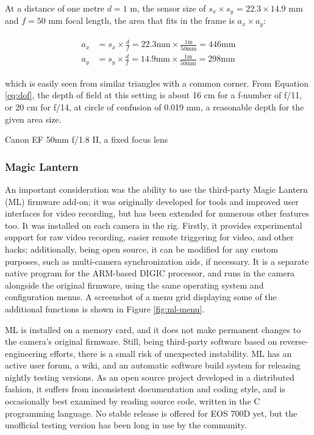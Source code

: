 At a distance of one metre $d = 1$ m, the sensor size of $s_x \times s_y$ = $22.3 \times 14.9$ mm and $f = 50$ mm focal length, the area that fits in the frame is $a_x \times a_y$:

\begin{align} \label{equ:areasize} \begin{split}
	a_x &= s_x \times \frac{d}{f} = 22.3 \text{mm} \times \frac{1 \text{m}}{50 \text{mm}} = 446 \text{mm}\\
	a_y &= s_y \times \frac{d}{f} = 14.9 \text{mm} \times \frac{1 \text{m}}{50 \text{mm}} = 298 \text{mm}
\end{split} \end{align}

which is easily seen from similar triangles with a common corner.
From Equation \ref{eq:dof}, the depth of field at this setting is about 16 cm for a f-number of f/11, or 20 cm for f/14, at circle of confusion of 0.019 mm, a reasonable depth for the given area size.

{Canon EF 50mm f/1.8 II, a fixed focus lens}

\subsubsection{Magic Lantern}

An important consideration was the ability to use the third-party Magic Lantern (ML) firmware add-on;
it was originally developed for tools and improved user interfaces for video recording, but has been extended for numerous other features too.
It was installed on each camera in the rig.
Firstly, it provides experimental support for raw video recording, easier remote triggering for video, and other hacks;
additionally, being open source, it can be modified for any custom purposes, such as multi-camera synchronization aids, if necessary.
It is a separate native program for the ARM-based DIGIC processor, and runs in the camera alongside the original firmware, using the same operating system and configuration menus. \cite{magiclantern}
A screenshot of a menu grid displaying some of the additional functions is shown in Figure \ref{fig:ml-menu}.

ML is installed on a memory card, and it does not make permanent changes to the camera's original firmware.
Still, being third-party software based on reverse-engineering efforts, there is a small risk of unexpected instability.
ML has an active user forum, a wiki, and an automatic software build system for releasing nightly testing versions.
As an open source project developed in a distributed fashion, it suffers from inconsistent documentation and coding style, and is occasionally best examined by reading source code, written in the C programming language.
No stable release is offered for EOS 700D yet, but the unofficial testing version has been long in use by the community. \cite{magiclantern}

